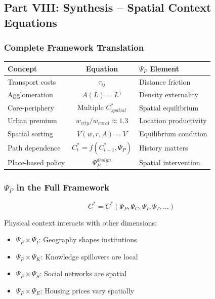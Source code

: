 \subsection{Part VIII: Synthesis – Spatial Context Equations}

\subsubsection{Complete Framework Translation}

\begin{center}
\renewcommand{\arraystretch}{1.5}
\begin{tabular}{|l|c|l|}
\hline
\textbf{Concept} & \textbf{Equation} & \textbf{$\Psi_P$ Element} \\
\hline
Transport costs & $\tau_{ij}$ & Distance friction \\
\hline
Agglomeration & $A(L) = L^\gamma$ & Density externality \\
\hline
Core-periphery & Multiple $C^*_{spatial}$ & Spatial equilibrium \\
\hline
Urban premium & $w_{city} / w_{rural} \approx 1.3$ & Location productivity \\
\hline
Spatial sorting & $V(w,r,A) = \bar{V}$ & Equilibrium condition \\
\hline
Path dependence & $C^*_t = f(C^*_{t-1}, \Psi_P)$ & History matters \\
\hline
Place-based policy & $\Psi_P^{design}$ & Spatial intervention \\
\hline
\end{tabular}
\end{center}

\subsubsection{$\Psi_P$ in the Full Framework}

\begin{equation}
\boxed{
C^* = C^*(\Psi_P, \Psi_C, \Psi_I, \Psi_T, \ldots)
}
\end{equation}

Physical context interacts with other dimensions:
\begin{itemize}
    \item $\Psi_P \times \Psi_I$: Geography shapes institutions
    \item $\Psi_P \times \Psi_K$: Knowledge spillovers are local
    \item $\Psi_P \times \Psi_S$: Social networks are spatial
    \item $\Psi_P \times \Psi_E$: Housing prices vary spatially
\end{itemize}

